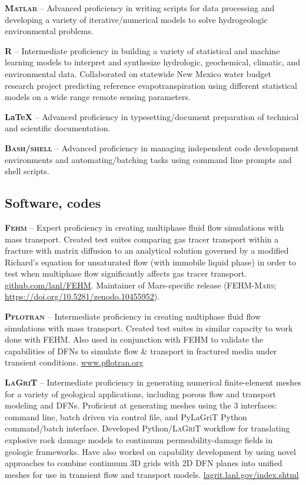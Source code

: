 \documentclass[11pt, letterpaper]{article}
\begin{document}
\textbf{\textsc{Matlab}} -- Advanced proficiency in writing scripts for data
processing and developing a variety of iterative/numerical models to solve
hydrogeologic environmental problems.

\textbf{\textsc{R}} -- Intermediate proficiency in building a variety of
statistical and machine learning models to interpret and synthesize hydrologic,
geochemical, climatic, and environmental data. Collaborated on statewide New
Mexico water budget research project predicting reference evapotranspiration
using different statistical models on a wide range remote sensing parameters.

\textbf{\LaTeX} -- Advanced proficiency in typesetting/document preparation of
technical and scientific documentation.

\textbf{\textsc{Bash/shell}} -- Advanced proficiency in managing independent
code development environments and automating/batching tasks using command
line prompts and shell scripts. 


\subsection*{Software, codes}
\noindent
\textbf{\textsc{Fehm}} -- Expert proficiency in creating multiphase fluid
flow simulations with mass transport. Created test suites comparing gas
tracer transport within a fracture with matrix diffusion to an analytical
solution governed by a modified Richard's equation for unsaturated flow (with
immobile liquid phase) in order to test when multiphase flow significantly
affects gas tracer transport.
\href{https://github.com/lanl/FEHM}{github.com/lanl/FEHM}. Maintainer of
Mars-specific release (\textsc{FEHM-Mars};
\href{https://doi.org/10.5281/zenodo.10455952}{https://doi.org/10.5281/zenodo.10455952}).

\textbf{\textsc{Pflotran}} -- Intermediate proficiency in creating multiphase
fluid flow simulations with mass transport. Created test suites in similar
capacity to work done with FEHM. Also used in conjunction with FEHM to validate
the capabilities of DFNs to simulate
flow \& transport in fractured media under transient conditions.
\href{https://www.pflotran.org}{www.pflotran.org} 

\textbf{\textsc{LaGriT}} -- Intermediate proficiency in generating numerical
finite-element meshes for a variety of geological applications, including
porous flow and transport modeling and DFNs. Proficient at generating meshes
using the 3 interfaces: command line, batch driven via control file, and
PyLaGriT Python command/batch interface. Developed Python/\textsc{LaGriT}
workflow for translating explosive rock damage models to continuum
permeability-damage fields in geologic frameworks. Have also worked on
capability development by using novel approaches to combine continuum 3D grids
with 2D DFN planes into unified meshes for use in transient flow and transport
models.
\href{https://lagrit.lanl.gov/index.shtml}{lagrit.lanl.gov/index.shtml}
\end{document}
